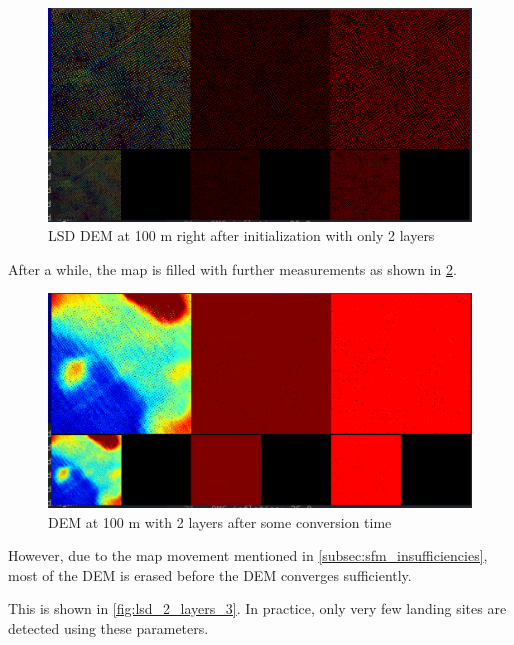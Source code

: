 \begin{figure}[h]
\centering
\includegraphics[scale=0.24]{images/evaluation/LSD_layer_analysis/2_layers_1.png}
\caption{LSD DEM at 100 m right after initialization with only 2 layers}
\label{fig:lsd_2_layers_1}
\end{figure}

After a while, the map is filled with further measurements as shown in \cref{fig:lsd_2_layers_2}.

\begin{figure}[h]
\centering
\includegraphics[scale=0.24]{images/evaluation/LSD_layer_analysis/2_layers_2.png}
\caption{DEM at 100 m with 2 layers after some conversion time}
\label{fig:lsd_2_layers_2}
\end{figure}

However, due to the map movement mentioned in \cref{subsec:sfm_insufficiencies}, most of the DEM is erased before the DEM converges sufficiently. 

This is shown in \cref{fig:lsd_2_layers_3}. In practice, only very few landing sites are detected using these parameters. 


